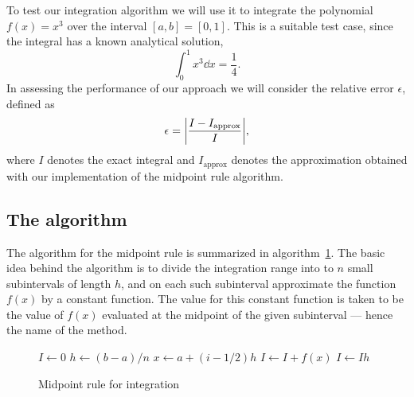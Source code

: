 \documentclass[english,notitlepage,reprint,nofootinbib]{revtex4-1}  %
\begin{document}
To test our integration algorithm we will use it to integrate the polynomial $f(x) = x^3$ over the interval $[a,b] = [0,1]$. This is a suitable test case, since the integral has a known analytical solution,
\begin{equation}
    \int_0^1 x^3 \dd x = \frac{1}{4}.
\end{equation}
In assessing the performance of our approach we will consider the relative error $\epsilon$, defined as
\begin{equation}
    \epsilon = \abs{ \frac{I - I_{\text{approx}}}{I} },
\end{equation}
where $I$ denotes the exact integral and $I_\text{approx}$ denotes the approximation obtained with our implementation of the midpoint rule algorithm.


\subsection*{The algorithm}
%
The algorithm for the midpoint rule is summarized in algorithm~\ref{algo:midpointrule}. The basic idea behind the algorithm is to divide the integration range into to $n$ small subintervals of length $h$, and on each such subinterval approximate the function $f(x)$ by a constant function. The value for this constant function is taken to be the value of $f(x)$ evaluated at the midpoint of the given subinterval --- hence the name of the method.
%
\begin{figure}
    \begin{algorithm}[H]
    \caption{Midpoint rule for integration}
    \label{algo:midpointrule}
        \begin{algorithmic}
            \State $I \leftarrow 0$        
            \State $h \leftarrow (b-a)/n$  
            \State $x \leftarrow a + (i-1/2)h$    %
            \State $I \leftarrow I + f(x)$   %
            \EndFor
            \State $I \leftarrow Ih$  
            \EndProcedure
        \end{algorithmic}
    \end{algorithm}
\end{figure}
\end{document}

